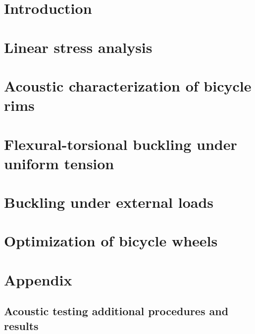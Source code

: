 \documentclass{nuthesis}
\begin{document}
\tableofcontents


\chapter{Introduction}
\label{chap:introduction}



\chapter{Linear stress analysis}
\label{chap:stress_analysis}



\chapter{Acoustic characterization of bicycle rims}
\label{chap:acoustic_testing}



\chapter{Flexural-torsional buckling under uniform tension}
\label{chap:tension_buckling}



\chapter{Buckling under external loads}
\label{chap:buckling_ext_loads}



\chapter{Optimization of bicycle wheels}
\label{chap:optimization}






\appendix

\chapter{Appendix}
\label{sec:appendix}

\section{Acoustic testing additional procedures and results}
\label{app:acoustic_testing}

\end{document}
